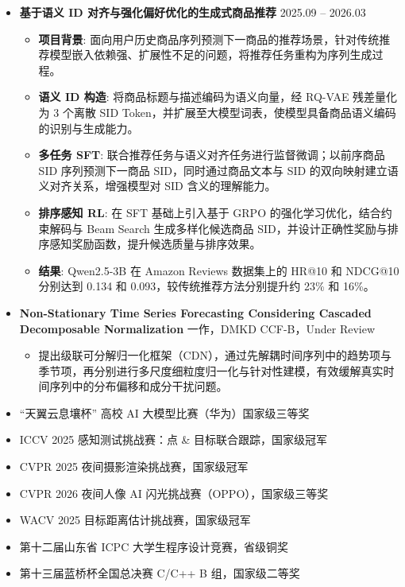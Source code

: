 \documentclass[zh]{resume}
\begin{document}
\begin{itemize}
  \item \textbf{基于语义 ID 对齐与强化偏好优化的生成式商品推荐} \hfill 2025.09 -- 2026.03
  \begin{itemize}
    \item \textbf{项目背景}: 面向用户历史商品序列预测下一商品的推荐场景，针对传统推荐模型嵌入依赖强、扩展性不足的问题，将推荐任务重构为序列生成过程。
    \item \textbf{语义 ID 构造}: 将商品标题与描述编码为语义向量，经 RQ-VAE 残差量化为 3 个离散 SID Token，并扩展至大模型词表，使模型具备商品语义编码的识别与生成能力。
    \item \textbf{多任务 SFT}: 联合推荐任务与语义对齐任务进行监督微调；以前序商品 SID 序列预测下一商品 SID，同时通过商品文本与 SID 的双向映射建立语义对齐关系，增强模型对 SID 含义的理解能力。
    \item \textbf{排序感知 RL}: 在 SFT 基础上引入基于 GRPO 的强化学习优化，结合约束解码与 Beam Search 生成多样化候选商品 SID，并设计正确性奖励与排序感知奖励函数，提升候选质量与排序效果。
    \item \textbf{结果}: Qwen2.5-3B 在 Amazon Reviews 数据集上的 HR@10 和 NDCG@10 分别达到 0.134 和 0.093，较传统推荐方法分别提升约 23\% 和 16\%。
  \end{itemize}
\end{itemize}

\begin{itemize}
  \item \textbf{Non-Stationary Time Series Forecasting Considering Cascaded Decomposable Normalization} \hfill 一作，DMKD CCF-B，Under Review
  \begin{itemize}
    \item 提出级联可分解归一化框架（CDN），通过先解耦时间序列中的趋势项与季节项，再分别进行多尺度细粒度归一化与针对性建模，有效缓解真实时间序列中的分布偏移和成分干扰问题。
  \end{itemize}
\end{itemize}

\begin{itemize}
  \item ``天翼云息壤杯'' 高校 AI 大模型比赛（华为）国家级三等奖
  \item ICCV 2025 感知测试挑战赛：点 \& 目标联合跟踪，国家级冠军
  \item CVPR 2025 夜间摄影渲染挑战赛，国家级冠军
  \item CVPR 2026 夜间人像 AI 闪光挑战赛（OPPO），国家级三等奖
  \item WACV 2025 目标距离估计挑战赛，国家级冠军
  \item 第十二届山东省 ICPC 大学生程序设计竞赛，省级铜奖
  \item 第十三届蓝桥杯全国总决赛 C/C++ B 组，国家级二等奖
\end{itemize}
\end{document}
